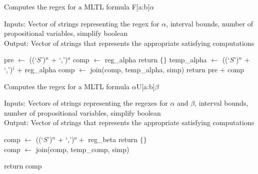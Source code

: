 \documentclass[runningheads]{llncs}
\begin{document}
\begin{algorithm}[H]
\caption{Computes the regex for a MLTL formula F[a:b]$\alpha$}
Inputs: Vector of strings representing the regex for $\alpha$, interval bounds, number of propositional variables, simplify boolean\\
Output: Vector of strings that represents the appropriate satisfying computations 
\begin{algorithmic}
    \State pre $\leftarrow$ ((`$S$')$^{n}$ + `,')$^{a}$ 
    \State comp $\leftarrow$ reg\_alpha 
     
        \State return $\{\}$
    \EndIf
     
        \State temp\_alpha $\leftarrow$ ((`$S$')$^{n}$ + `,')$^{i}$ + reg\_alpha
        \State comp $\leftarrow$ join(comp, temp\_alpha, simp)
    \EndFor
    \State return pre + comp 
\EndProcedure
\end{algorithmic}
\end{algorithm}
\label{regU}
\begin{algorithm}[H]
\caption{Computes the regex for a MLTL formula $\alpha$U[a:b]$\beta$} 
Inputs: Vectors of strings representing the regexes for $\alpha$ and $\beta$, interval bounds, number of propositional variables, simplify boolean\\
Output: Vector of strings that represents the appropriate satisfying computations 
\begin{algorithmic}
    \State comp $\leftarrow$ ((`$S$')$^{n}$ + `,')$^{a} + $ reg\_beta 
        \State return $\{\}$ 
    \EndIf
     \\
        \State comp $\leftarrow$ join(comp, temp\_comp, simp)
    \EndFor
    
    \State return comp
\EndProcedure
\end{algorithmic}
\end{algorithm}
\end{document}
